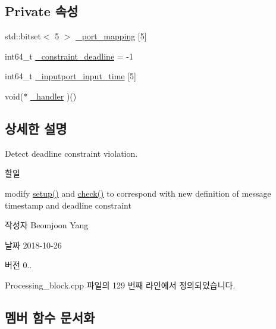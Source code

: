 \subsection*{Private 속성}
\begin{DoxyCompactItemize}
\item 
std\+::bitset$<$ 5 $>$ \hyperlink{classDeadlineMonitor__PB_a86839dadce69f56fba6589355b56513d}{\+\_\+port\+\_\+mapping} \mbox{[}5\mbox{]}
\item 
int64\+\_\+t \hyperlink{classDeadlineMonitor__PB_a4aff480c381c68671213b6c3779bb137}{\+\_\+constraint\+\_\+deadline} = -\/1
\item 
int64\+\_\+t \hyperlink{classDeadlineMonitor__PB_af11957e5aef255a6be8fb21f2f3719d7}{\+\_\+inputport\+\_\+input\+\_\+time} \mbox{[}5\mbox{]}
\item 
void($\ast$ \hyperlink{classDeadlineMonitor__PB_a637df7fb7c75351ea967d45c64f3af13}{\+\_\+handler} )()
\end{DoxyCompactItemize}


\subsection{상세한 설명}
Detect deadline constraint violation. 

\begin{DoxyRefDesc}{할일}
\item[\hyperlink{todo__todo000002}{할일}]modify \hyperlink{classDeadlineMonitor__PB_a6456b87d4c185b8a974f71cc7e729d83}{setup()} and \hyperlink{classDeadlineMonitor__PB_a7debcade9bbf07add3752aa980bc3b19}{check()} to correspond with new definition of message timestamp and deadline constraint \end{DoxyRefDesc}
\begin{DoxyAuthor}{작성자}
Beomjoon Yang 
\end{DoxyAuthor}
\begin{DoxyDate}{날짜}
2018-\/10-\/26 
\end{DoxyDate}
\begin{DoxyVersion}{버전}
0.. 
\end{DoxyVersion}


Processing\+\_\+block.\+cpp 파일의 129 번째 라인에서 정의되었습니다.



\subsection{멤버 함수 문서화}
